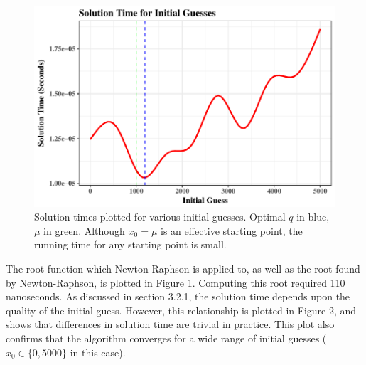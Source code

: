 \documentclass[12pt]{article}
\begin{document}
\begin{figure}
\includegraphics[width=\textwidth]{solution_times_report}
\caption{Solution times plotted for various initial guesses. Optimal $q$ in blue, $\mu$ in green. Although $x_0 = \mu$ is an effective starting point, the running time for any starting point is small.}
\end{figure}

The root function which Newton-Raphson is applied to, as well as the root found by Newton-Raphson, is plotted in Figure 1. Computing this root required 110 nanoseconds. As discussed in section 3.2.1, the solution time depends upon the quality of the initial guess. However, this relationship is plotted in Figure 2, and shows that differences in solution time are trivial in practice. This plot also confirms that the algorithm converges for a wide range of initial guesses ($x_0 \in \{0, 5000\}$ in this case).






\end{document}
